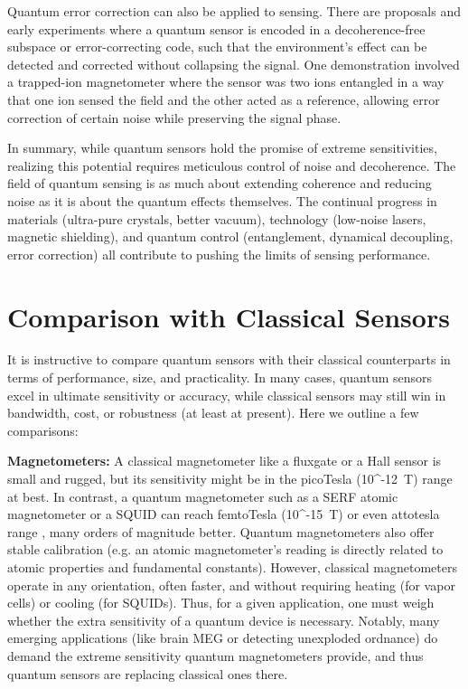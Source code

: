 Quantum error correction can also be applied to sensing. There are
proposals and early experiments where a quantum sensor is encoded in a
decoherence-free subspace or error-correcting code, such that the
environment’s effect can be detected and corrected without collapsing
the signal. One demonstration involved a trapped-ion magnetometer
where the sensor was two ions entangled in a way that one ion sensed
the field and the other acted as a reference, allowing error
correction of certain noise while preserving the signal phase.



In summary, while quantum sensors hold the promise of extreme
sensitivities, realizing this potential requires meticulous control of
noise and decoherence. The field of quantum sensing is as much about
extending coherence and reducing noise as it is about the quantum
effects themselves. The continual progress in materials (ultra-pure
crystals, better vacuum), technology (low-noise lasers, magnetic
shielding), and quantum control (entanglement, dynamical decoupling,
error correction) all contribute to pushing the limits of sensing
performance.



\section{Comparison with Classical Sensors}\label{sec:comparison}

It is instructive to compare quantum sensors with their classical
counterparts in terms of performance, size, and practicality. In many
cases, quantum sensors excel in ultimate sensitivity or accuracy,
while classical sensors may still win in bandwidth, cost, or
robustness (at least at present). Here we outline a few comparisons:



\textbf{Magnetometers:} A classical magnetometer like a fluxgate or a
Hall sensor is small and rugged, but its sensitivity might be in the
picoTesla (10^{-12}~T) range at best. In contrast, a quantum
magnetometer such as a SERF atomic magnetometer or a SQUID can reach
femtoTesla (10^{-15}~T) or even attotesla range , many orders of
magnitude better. Quantum magnetometers also offer stable calibration
(e.g. an atomic magnetometer’s reading is directly related to atomic
properties and fundamental constants). However, classical
magnetometers operate in any orientation, often faster, and without
requiring heating (for vapor cells) or cooling (for SQUIDs). Thus, for
a given application, one must weigh whether the extra sensitivity of a
quantum device is necessary. Notably, many emerging applications (like
brain MEG or detecting unexploded ordnance) do demand the extreme
sensitivity quantum magnetometers provide, and thus quantum sensors
are replacing classical ones there.



